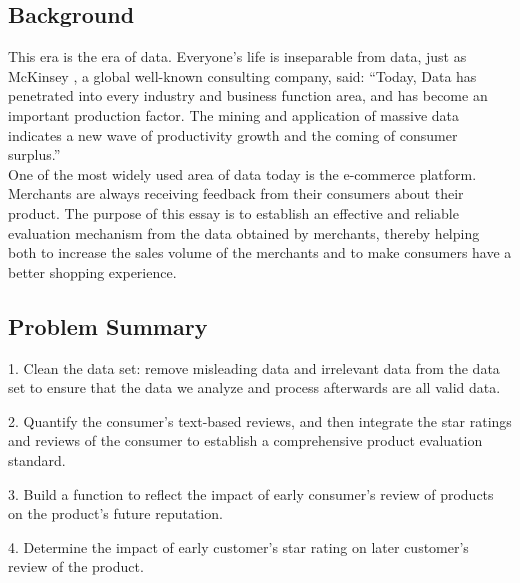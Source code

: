 \documentclass[12pt]{mcmthesis}
\begin{document}
\subsection{Background}
\indent This era is the era of data. Everyone's life is inseparable from data, just as McKinsey , a global well-known consulting company, said: “Today, Data has penetrated into every industry and business function area, and has become an important production factor. The mining and application of massive data indicates a new wave of productivity growth and the coming of consumer surplus.”\\
\indent One of the most widely used area of data today is the e-commerce platform. Merchants are always receiving feedback from their consumers about their product. The purpose of this essay is to establish an effective and reliable evaluation mechanism from the data obtained by merchants, thereby helping both to increase the sales volume of the merchants and to make consumers have a better shopping experience.\\
\subsection{Problem Summary}
\par 1. Clean the data set: remove misleading data and irrelevant data from the data set to ensure that the data we analyze and process afterwards are all valid data.

\par 2. Quantify the consumer's text-based reviews, and then integrate the star ratings and reviews of the consumer to establish a comprehensive product evaluation standard.

\par 3. Build a function to reflect the impact of early consumer's review of products on the product's future reputation.

\par 4. Determine the impact of early customer's star rating on later customer's review of the product.
\end{document}
